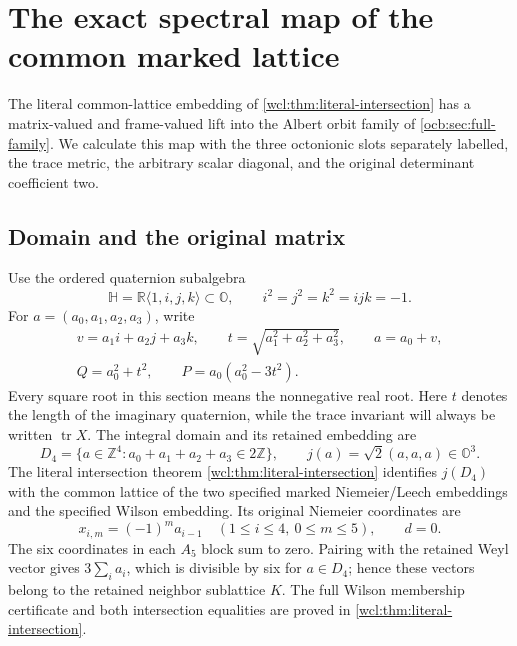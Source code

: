 \documentclass[11pt]{article}
\theoremstyle{definition}
\begin{document}
\section{The exact spectral map of the common marked lattice}
\label{ncs:sec:spectral-bridge}

The literal common-lattice embedding of
\cref{wcl:thm:literal-intersection} has a matrix-valued and
frame-valued lift into the Albert orbit family of
\cref{ocb:sec:full-family}. We calculate this map with the three
octonionic slots separately labelled, the trace metric, the arbitrary
scalar diagonal, and the original determinant coefficient two.

\subsection{Domain and the original matrix}
\label{ncs:sec:domain}

Use the ordered quaternion subalgebra
\[
 \mathbb H=\mathbb R\langle1,i,j,k\rangle\subset\mathbb O,
 \qquad i^2=j^2=k^2=ijk=-1.
\]
For $a=(a_0,a_1,a_2,a_3)$, write
\begin{equation}
 \begin{gathered}
 v=a_1i+a_2j+a_3k,\qquad
 t=\sqrt{a_1^2+a_2^2+a_3^2},\qquad a=a_0+v,\\
 Q=a_0^2+t^2,\qquad P=a_0(a_0^2-3t^2).
 \end{gathered}
 \label{ncs:eq:quaternion-coordinates}\tag{NCS1}
\end{equation}
Every square root in this section means the nonnegative real root.
Here $t$ denotes the length of the imaginary quaternion, while the
trace invariant will always be written $\operatorname{tr}X$.
The integral domain and its retained embedding are
\begin{equation}
 D_4=\{a\in\mathbb Z^4:a_0+a_1+a_2+a_3\in2\mathbb Z\},
 \qquad j(a)=\sqrt2(a,a,a)\in\mathbb O^3.
 \label{ncs:eq:lattice-embedding}\tag{NCS2}
\end{equation}
The literal intersection theorem
\cref{wcl:thm:literal-intersection} identifies $j(D_4)$ with the
common lattice of the two specified marked Niemeier/Leech embeddings
and the specified Wilson embedding. Its original Niemeier coordinates
are
\begin{equation}
 x_{i,m}=(-1)^m a_{i-1}\quad(1\le i\le4,\ 0\le m\le5),
 \qquad d=0.
 \label{ncs:eq:niemeier-coordinates}\tag{NCS3}
\end{equation}
The six coordinates in each $A_5$ block sum to zero. Pairing with
the retained Weyl vector gives $3\sum_i a_i$, which is divisible
by six for $a\in D_4$; hence these vectors belong to the retained
neighbor sublattice $K$. The full Wilson membership certificate and
both intersection equalities are proved in
\cref{wcl:thm:literal-intersection}.
\end{document}
